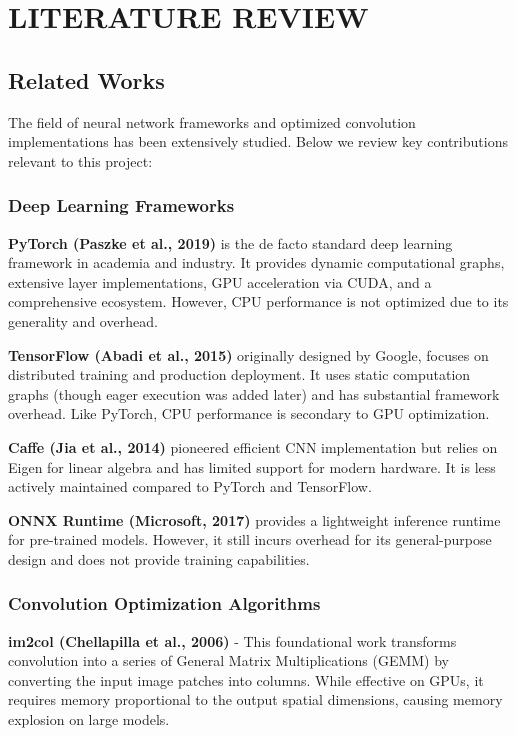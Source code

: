 \documentclass[12pt,oneside,a4paper]{report}
\begin{document}
\chapter{LITERATURE REVIEW}

\section{Related Works}

The field of neural network frameworks and optimized convolution implementations has been extensively studied. Below we review key contributions relevant to this project:

\subsection{Deep Learning Frameworks}

\textbf{PyTorch (Paszke et al., 2019)} is the de facto standard deep learning framework in academia and industry. It provides dynamic computational graphs, extensive layer implementations, GPU acceleration via CUDA, and a comprehensive ecosystem. However, CPU performance is not optimized due to its generality and overhead.

\textbf{TensorFlow (Abadi et al., 2015)} originally designed by Google, focuses on distributed training and production deployment. It uses static computation graphs (though eager execution was added later) and has substantial framework overhead. Like PyTorch, CPU performance is secondary to GPU optimization.

\textbf{Caffe (Jia et al., 2014)} pioneered efficient CNN implementation but relies on Eigen for linear algebra and has limited support for modern hardware. It is less actively maintained compared to PyTorch and TensorFlow.

\textbf{ONNX Runtime (Microsoft, 2017)} provides a lightweight inference runtime for pre-trained models. However, it still incurs overhead for its general-purpose design and does not provide training capabilities.

\subsection{Convolution Optimization Algorithms}

\textbf{im2col (Chellapilla et al., 2006)} - This foundational work transforms convolution into a series of General Matrix Multiplications (GEMM) by converting the input image patches into columns. While effective on GPUs, it requires memory proportional to the output spatial dimensions, causing memory explosion on large models.
\end{document}
